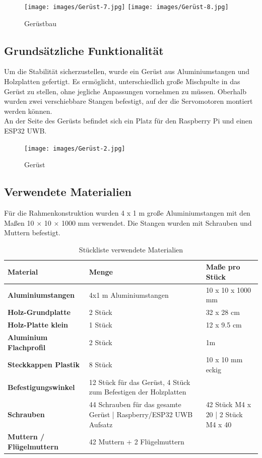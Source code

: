 \begin{figure}[H]
	\centering
	\texttt{[image: images/Gerüst-7.jpg]}
	\texttt{[image: images/Gerüst-8.jpg]}
	\caption[Gerüstbau]{Gerüstbau}
	\label{fig:Gerüstbau}
\end{figure}

\newpage
\subsection{Grundsätzliche Funktionalität}
Um die Stabilität sicherzustellen, wurde ein Gerüst aus Aluminiumstangen und Holzplatten gefertigt. Es ermöglicht, unterschiedlich große Mischpulte in das Gerüst zu stellen, ohne jegliche Anpassungen vornehmen zu müssen. Oberhalb wurden zwei verschiebbare Stangen befestigt, auf der die Servomotoren montiert werden können.\\
An der Seite des Gerüsts befindet sich ein Platz für den Raspberry Pi und einen ESP32 UWB.

\begin{figure}[H]
	\centering
	\texttt{[image: images/Gerüst-2.jpg]}
	\caption[Gerüst]{Gerüst}
	\label{fig:Gerüst-1}
\end{figure}


\newpage
\subsection{Verwendete Materialien}
Für die Rahmenkonstruktion wurden 4 x 1 m große Aluminiumstangen mit den Maßen 10 × 10 × 1000 mm verwendet. Die Stangen wurden mit Schrauben und Muttern befestigt.\\

\begin{table} [H]
	\begin{tabular}{ |p{3.3cm} |p{4.8cm}|p{4.8cm}| }
		\hline
		\textbf{Material} & \textbf{Menge}& \textbf{Maße pro Stück}\\
		\hline
		\textbf{Aluminiumstangen} & 4x1 m Aluminiumstangen & 10 x 10 x 1000 mm  \\ 
		\hline
		\textbf{Holz-Grundplatte} & 2 Stück & 32 x 28 cm   \\  
		\hline
		\textbf{Holz-Platte klein} & 1 Stück & 12 x 9.5 cm   \\  
		\hline
		\textbf{Aluminium Flachprofil} & 2 Stück  & 1m \\
		\hline
		\textbf{Steckkappen Plastik} & 8 Stück & 10 x 10 mm eckig  \\
		\hline
		\textbf{Befestigungswinkel}& 12 Stück für das Gerüst, 4 Stück zum Befestigen der Holzplatten   &  \\
		\hline
		\textbf{Schrauben}& 44 Schrauben für das gesamte Gerüst | 	Raspberry/ESP32 UWB Aufsatz & 42 Stück M4 x 20 | 2 Stück M4 x 40\\
		\hline
		\textbf{Muttern / Flügelmuttern}& 42 Muttern + 2 Flügelmuttern & \\
		\hline	
	\end{tabular}
	\caption{Stückliste verwendete Materialien} 
\end{table} 



